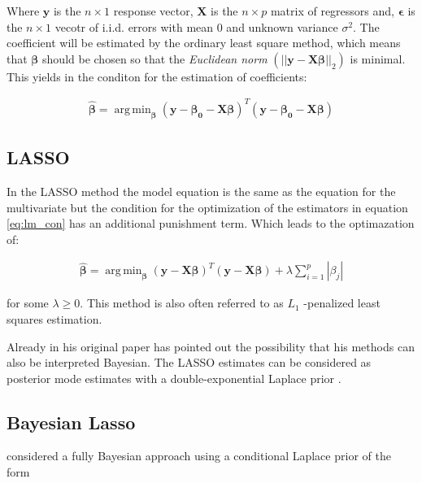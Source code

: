 \documentclass[12pt,a4paper]{article}
\DeclareMathOperator*{\argmin}{arg\,min}
\begin{document}
Where \(\pmb{y}\) is the \(n \times 1\) response vector, \(\pmb{X}\) is
the \(n \times p\) matrix of regressors and, \(\pmb{\epsilon}\) is the
\(n \times 1\) vecotr of \ac{i.i.d.} errors with mean 0 and unknown
variance \(\sigma^2\). The coefficient will be estimated by the ordinary
least square method, which means that \(\pmb{\beta}\) should be chosen
so that the \emph{Euclidean norm}
\(\left( || \mathbf{y - X\beta} ||_2 \right)\) is minimal. This yields
in the conditon for the estimation of coefficients:

\begin{align}
\label{eq:lm_con}
 \hat{\pmb{\beta}} = \argmin_{ \pmb{\beta}} (\pmb{y - \beta_0 - X  \beta})^T (\pmb{y - \beta_0 - X  \beta})
\end{align}

\hypertarget{section}{%
\subsection{\texorpdfstring{\acf{LASSO}}{}}\label{section}}

In the \ac{LASSO} method the model equation is the same as the equation
for the multivariate but the condition for the optimization of the
estimators in equation \eqref{eq:lm_con} has an additional punishment
term. Which leads to the optimazation of:

\begin{align}
\label{eq:la_con}
\hat{\pmb{\beta}} = \argmin_{\pmb{\beta}}  \left( \pmb{y - X \beta} \right)^T \left( \pmb{y - X \beta} \right) + \lambda \sum_{i = 1}^{p} |\beta_j|
\end{align}

for some \(\lambda \geq 0\). This method is also often referred to as
\(L_1\) -penalized least squares estimation.

Already in his original paper \textcite{tibshirani_regression_1996} has
pointed out the possibility that his methods can also be interpreted
Bayesian. The LASSO estimates can be considered as posterior mode
estimates with a double-exponential Laplace prior .

\hypertarget{bayesian-lasso}{%
\subsection{Bayesian Lasso}\label{bayesian-lasso}}

\textcite{park_bayesian_2008} considered a fully Bayesian approach using
a conditional Laplace prior of the form
\end{document}
